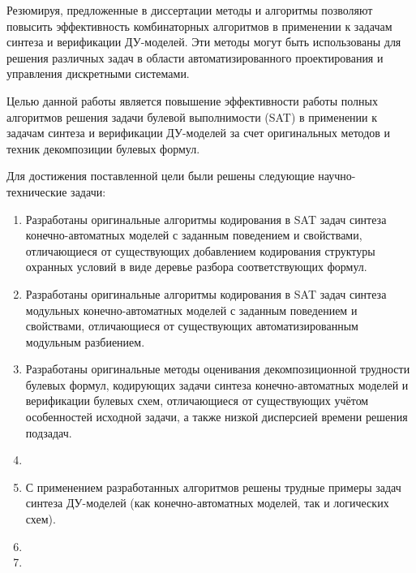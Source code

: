 Резюмируя, предложенные в диссертации методы и алгоритмы позволяют повысить эффективность комбинаторных алгоритмов в применении к задачам синтеза и верификации ДУ-моделей.
Эти методы могут быть использованы для решения различных задач в области автоматизированного проектирования и управления дискретными системами.


{\aim}
Целью данной работы является повышение эффективности работы полных алгоритмов решения задачи булевой выполнимости (SAT) в применении к задачам синтеза и верификации ДУ-моделей за счет оригинальных методов и техник декомпозиции булевых формул.


{\tasks}
Для достижения поставленной цели были решены следующие научно-технические задачи:
\begin{enumerate}[beginpenalty=10000]
    \item Разработаны оригинальные алгоритмы кодирования в SAT задач синтеза конечно-автоматных моделей с заданным поведением и свойствами, отличающиеся от существующих добавлением кодирования структуры охранных условий в виде деревье разбора соответствующих формул.
    \item Разработаны оригинальные алгоритмы кодирования в SAT задач синтеза модульных конечно-автоматных моделей с заданным поведением и свойствами, отличающиеся от существующих автоматизированным модульным разбиением.
    \item Разработаны оригинальные методы оценивания декомпозиционной трудности булевых формул, кодирующих задачи синтеза конечно-автоматных моделей и верификации булевых схем, отличающиеся от существующих учётом особенностей исходной задачи, а также низкой дисперсией времени решения подзадач.
    \item {}
    \item С применением разработанных алгоритмов решены трудные примеры задач синтеза ДУ-моделей (как конечно-автоматных моделей, так и логических схем).
    \item {}
    \item {}
\end{enumerate}


